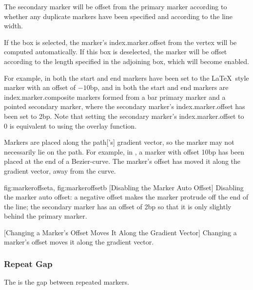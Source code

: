 The secondary marker will be offset from the primary marker
according to whether any duplicate markers have been specified and
according to the line width.


If the  box is selected, the marker's
\gls{index.marker.offset} from the vertex will be computed automatically. 
If this box is deselected, the marker will be offset according to
the length specified in the adjoining box, which will become
enabled.

For example, in  both the start and end
markers have been set to the \LaTeX\ style marker with an offset of
$-10$\gls{bp}, and in  both the start
and end markers are \gls{index.marker.composite} markers formed from
a bar primary marker and a pointed secondary marker, where the
secondary marker's \gls{index.marker.offset} has been set to
2\gls{bp}.  Note that setting the secondary marker's \gls{index.marker.offset}
to 0 is equivalent to using the overlay function.

\begin{information}
Markers are placed along the \gls{path}['s] gradient
vector, so the marker may not necessarily lie on the \gls*{path}. For
example, in , a marker with offset 10\gls{bp}
has been placed at the end of a \gls{Bezier-curve}. The marker's offset
has moved it along the gradient vector, away from the curve.
\end{information}

{
  {fig:markeroffseta}{}{},
  {fig:markeroffsetb}{}{}
}
[Disabling the Marker Auto Offset]
{Disabling the marker auto offset:
 a negative offset makes the marker protrude off
the end of the line;
 the secondary marker has an offset
of 2bp so that it is only slightly behind the primary marker.}

{}
[Changing a Marker's Offset Moves It Along the Gradient Vector]
{Changing a marker's offset moves it along the gradient vector.}

\subsubsection{Repeat Gap}\label{sec:repeatgap}

The  is the gap between
repeated markers.


